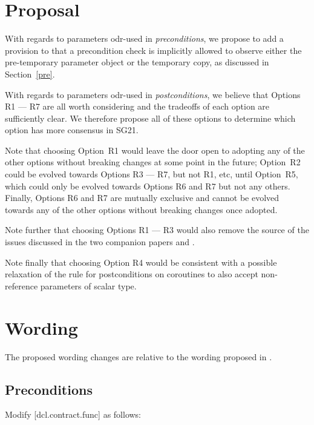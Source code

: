 \section{Proposal}

With regards to parameters odr-used in \emph{preconditions}, we propose to add a provision to \cite{P2900R10} that a precondition check is implicitly allowed to observe either the pre-temporary parameter object or the temporary copy, as discussed in Section~\ref{pre}.

With regards to parameters odr-used in \emph{postconditions}, we believe that Options R1 --- R7 are all worth considering and the tradeoffs of each option are sufficiently clear. We therefore propose all of these options to determine which option has more consensus in SG21. 

Note that choosing Option~R1 would leave the door open to adopting any of the other options without breaking changes at some point in the future; Option~R2 could be evolved towards Options R3 --- R7, but not R1, etc, until Option~R5, which could only be evolved towards Options R6 and R7 but not any others. Finally, Options R6 and R7 are mutually exclusive and cannot be evolved towards any of the other options without breaking changes once adopted.

Note further that choosing Options R1 --- R3 would also remove the source of the issues discussed in the two companion papers \cite{D3484R1} and \cite{D3489R0}. 

Note finally that choosing Option R4 would be consistent with a possible relaxation of the rule for postconditions on coroutines to also accept non-reference parameters of scalar type.

\section{Wording}

The proposed wording changes are relative to the wording proposed in \cite{P2900R10}.

\subsection*{Preconditions}

Modify [dcl.contract.func] as follows:

